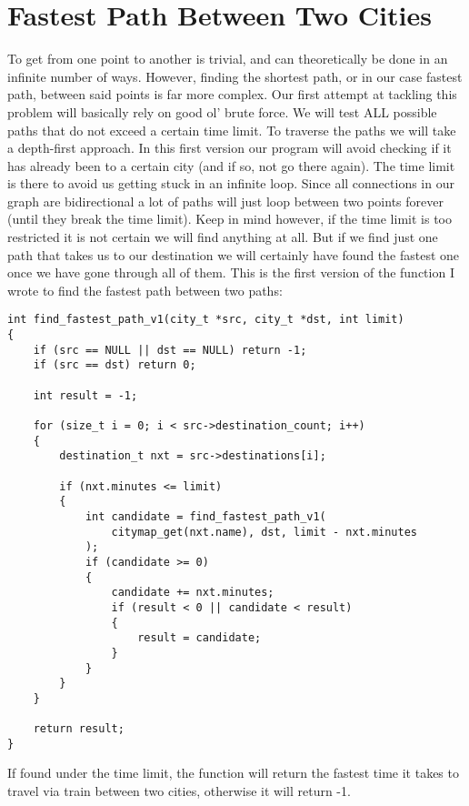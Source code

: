 \documentclass[a4paper, 11pt]{article}
\begin{document}
\section{Fastest Path Between Two Cities}
	To get from one point to another is trivial, and can theoretically be done in an infinite number of ways.
	However, finding the shortest path, or in our case fastest path, between said points is far more complex.
	Our first attempt at tackling this problem will basically rely on good ol' brute force.
	We will test ALL possible paths that do not exceed a certain time limit.
	To traverse the paths we will take a depth-first approach.
	In this first version our program will avoid checking if it has already been to a certain city (and if so, not go there again).
	The time limit is there to avoid us getting stuck in an infinite loop.
	Since all connections in our graph are bidirectional a lot of paths will just loop between two points forever (until they break the time limit).
	Keep in mind however, if the time limit is too restricted it is not certain we will find anything at all.
	But if we find just one path that takes us to our destination we will certainly have found the fastest one once we have gone through all of them.
	This is the first version of the function I wrote to find the fastest path between two paths:
	\begin{verbatim}
int find_fastest_path_v1(city_t *src, city_t *dst, int limit)
{
	if (src == NULL || dst == NULL) return -1;
	if (src == dst) return 0;

	int result = -1;

	for (size_t i = 0; i < src->destination_count; i++)
	{
		destination_t nxt = src->destinations[i];

		if (nxt.minutes <= limit)
		{
			int candidate = find_fastest_path_v1(
				citymap_get(nxt.name), dst, limit - nxt.minutes
			);
			if (candidate >= 0)
			{
				candidate += nxt.minutes;
				if (result < 0 || candidate < result)
				{
					result = candidate;
				}
			}
		}
	}

	return result;
}
	\end{verbatim}
	If found under the time limit, the function will return the fastest time it takes to travel via train between two cities, otherwise it will return -1.
\end{document}
